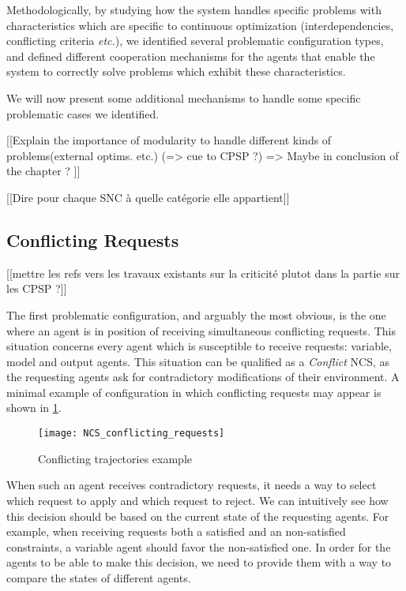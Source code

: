 Methodologically, by studying how the system handles specific problems with characteristics which are specific to continuous optimization (interdependencies, conflicting criteria \emph{etc.}), we identified several problematic configuration types, and defined different cooperation mechanisms for the agents that enable the system to correctly solve problems which exhibit these characteristics.

We will now present some additional mechanisms to handle some specific problematic cases we identified.

[[Explain the importance of modularity to handle different kinds of problems(external optims. etc.)
(=> cue to CPSP ?)
=> Maybe in conclusion of the chapter ?
]]

[[Dire pour chaque SNC à quelle catégorie elle appartient]]

\subsection{Conflicting Requests}

[[mettre les refs vers les travaux existants sur la criticité plutot dans la partie sur les CPSP ?]]

The first problematic configuration, and arguably the most obvious, is the one where an agent is in position of receiving simultaneous conflicting requests. This situation concerns every agent which is susceptible to receive requests: variable, model and output agents. This situation can be qualified as a \emph{Conflict} NCS, as the requesting agents ask for contradictory modifications of their environment. A minimal example of configuration in which conflicting requests may appear is shown in \figurename{} \ref{NCS_conflicting_requests}.

\begin{figure}
\centering
\texttt{[image: NCS\_conflicting\_requests]}
\caption{Conflicting trajectories example}\label{NCS_conflicting_requests}
\end{figure}

When such an agent receives contradictory requests, it needs a way to select which request to apply and which request to reject. We can intuitively see how this decision should be based on the current state of the requesting agents. For example, when receiving requests both a satisfied and an non-satisfied constraints, a variable agent should favor the non-satisfied one. In order for the agents to be able to make this decision, we need to provide them with a way to compare the states of different agents.

